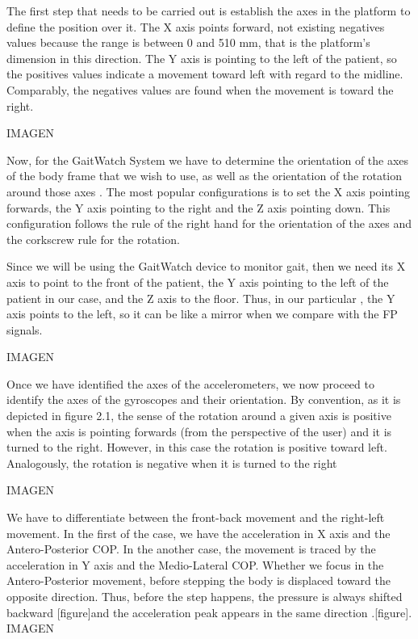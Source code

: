 The first step that needs to be carried out is establish the axes in the platform to define the position over it. The X axis points forward, not existing negatives values because the range is between 0 and 510 mm, that is the platform’s dimension in this direction. The Y axis is pointing to the left of the patient, so the positives values indicate a movement toward left with regard to the midline. Comparably, the negatives values are found when the movement is toward the right.

IMAGEN

Now, for the GaitWatch System we have to determine the orientation of the axes of the body frame that we wish to use, as well as the orientation of the rotation around those axes . The most popular configurations is to set the X axis pointing forwards, the Y axis pointing to the right and the Z axis pointing down. This configuration follows the rule of the right hand for the orientation of the axes and the corkscrew rule for the rotation. \cite{OlivaresBotzel2013Mancini2009}

Since we will be using the GaitWatch device to monitor gait, then we need its X axis to point to the front of the patient, the Y axis pointing to the left  of the patient in our case, and the Z axis to the floor. Thus, in our particular , the Y axis points to the left, so it can be like a mirror when we compare with the FP signals.\cite{OlivaresBotzel2013Mancini2009}

IMAGEN

Once we have identified the axes of the accelerometers, we now proceed to identify the axes of the gyroscopes and their orientation. By convention, as it is depicted in figure 2.1, the sense of the rotation around a given axis is positive when the axis is pointing forwards (from the perspective of the user) and it is turned to the right. However, in this case the rotation is positive toward left. Analogously, the rotation is negative when it is turned to the right \cite{OlivaresBotzel2013Mancini2009}

IMAGEN


We have to differentiate between the front-back movement and the right-left movement. In the first of the case, we have the acceleration in X axis and the Antero-Posterior COP. In the another case, the movement is traced by the acceleration in Y axis and the Medio-Lateral  COP.
Whether we focus in the Antero-Posterior movement, before stepping the body is displaced toward the opposite direction. Thus, before the step happens, the pressure is always shifted backward [figure]and the acceleration peak appears in the same direction .[figure].
IMAGEN


